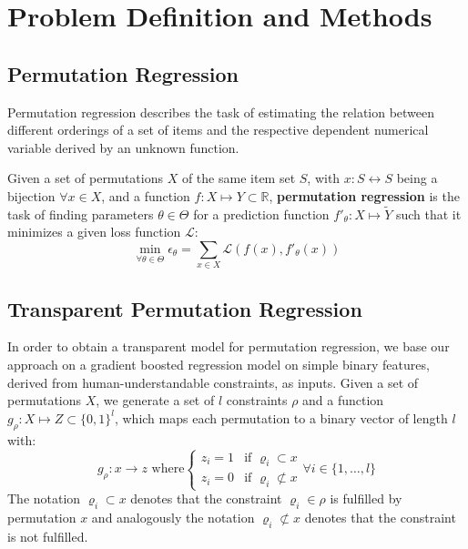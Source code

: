 \section{Problem Definition and Methods}
\label{theory}
\subsection{Permutation Regression}

Permutation regression describes the task of estimating the relation between different orderings of a set of items and the respective dependent numerical variable derived by an unknown function. 
\par

\begin{definition}
Given a set of permutations $X$ of the same item set $S$, with $x:S \leftrightarrow S$ being a bijection $\forall x \in X$, and a function $f:X \mapsto Y \subset \mathbb{R}$, \textbf{permutation regression} is the task of finding parameters $\theta \in \Theta$ for a prediction function $f'_{\theta} : X \mapsto \tilde{Y}$ such that it minimizes a given loss function $\mathcal{L}$:
\begin{equation*}
    \min_{\forall \theta \in \Theta} \epsilon_{\theta} = \sum_{x \in X}\mathcal{L}(f(x),f'_{\theta}(x))
\end{equation*} 
\label{def:permutationregression}
\end{definition}

\subsection{Transparent Permutation Regression}
\label{transpermreg}
In order to obtain a transparent model for permutation regression, we base our approach on a gradient boosted regression model on simple binary features, derived from human-understandable constraints, as inputs. Given a set of permutations $X$, we generate a set of $l$ constraints $\rho$ and a function $g_{\rho} : X \mapsto Z \subset \{0,1\}^l$,  which maps each permutation to a binary vector of length $l$ with:
\begin{equation*}
    g_{\rho} : x \rightarrow z \text{ where} \begin{cases}
        z_i = 1&  \text{if } \varrho_i \subset x \\
        z_i = 0& \text{if } \varrho_i \not\subset x
    \end{cases} \forall i \in \{1,\dots,l\}
\end{equation*}
The notation $\varrho_i \subset x$ denotes that the constraint $\varrho_i \in \rho$ is fulfilled by permutation $x$ and analogously the notation $\varrho_i \not\subset x$ denotes that the constraint is not fulfilled.

